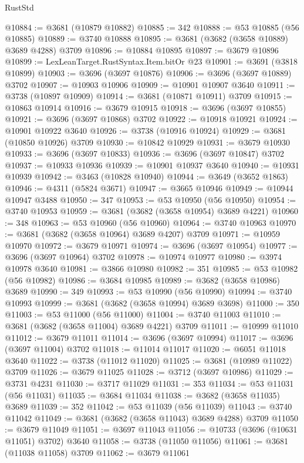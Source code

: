 \begin{lexlean}{RustStd}
\begin{coremodule}
@10884 := @3681 (@10879 @10882)
@10885 := 342
@10888 := @53 @10885 (@56 @10885)
@10889 := @3740 @10888
@10895 := @3681 (@3682 (@3658 @10889) @3689 @4288) @3709
@10896 := @10884 @10895
@10897 := @3679 @10896
@10899 := LexLeanTarget.RustSyntax.Item.bitOr @23
@10901 := @3691 (@3818 @10899)
@10903 := @3696 (@3697 @10876)
@10906 := @3696 (@3697 @10889) @3702
@10907 := @10903 @10906
@10909 := @10901 @10907 @3640
@10911 := @3738 (@10897 @10909)
@10914 := @3681 (@10871 @10911) @3709
@10915 := @10863 @10914
@10916 := @3679 @10915
@10918 := @3696 (@3697 @10855)
@10921 := @3696 (@3697 @10868) @3702
@10922 := @10918 @10921
@10924 := @10901 @10922 @3640
@10926 := @3738 (@10916 @10924)
@10929 := @3681 (@10850 @10926) @3709
@10930 := @10842 @10929
@10931 := @3679 @10930
@10933 := @3696 (@3697 @10833)
@10936 := @3696 (@3697 @10847) @3702
@10937 := @10933 @10936
@10939 := @10901 @10937 @3640
@10940 := @10931 @10939
@10942 := @3463 (@10828 @10940)
@10944 := @3649 (@3652 @1863)
@10946 := @4311 (@5824 @3671)
@10947 := @3665 @10946
@10949 := @10944 @10947 @3488
@10950 := 347
@10953 := @53 @10950 (@56 @10950)
@10954 := @3740 @10953
@10959 := @3681 (@3682 (@3658 @10954) @3689 @4221)
@10960 := 348
@10963 := @53 @10960 (@56 @10960)
@10964 := @3740 @10963
@10970 := @3681 (@3682 (@3658 @10964) @3689 @4207) @3709
@10971 := @10959 @10970
@10972 := @3679 @10971
@10974 := @3696 (@3697 @10954)
@10977 := @3696 (@3697 @10964) @3702
@10978 := @10974 @10977
@10980 := @3974 @10978 @3640
@10981 := @3866 @10980
@10982 := 351
@10985 := @53 @10982 (@56 @10982)
@10986 := @3684 @10985
@10989 := @3682 (@3658 @10986) @3689
@10990 := 349
@10993 := @53 @10990 (@56 @10990)
@10994 := @3740 @10993
@10999 := @3681 (@3682 (@3658 @10994) @3689 @3698)
@11000 := 350
@11003 := @53 @11000 (@56 @11000)
@11004 := @3740 @11003
@11010 := @3681 (@3682 (@3658 @11004) @3689 @4221) @3709
@11011 := @10999 @11010
@11012 := @3679 @11011
@11014 := @3696 (@3697 @10994)
@11017 := @3696 (@3697 @11004) @3702
@11018 := @11014 @11017
@11020 := @6051 @11018 @3640
@11022 := @3738 (@11012 @11020)
@11025 := @3681 (@10989 @11022) @3709
@11026 := @3679 @11025
@11028 := @3712 (@3697 @10986)
@11029 := @3731 @4231
@11030 := @3717 @11029
@11031 := 353
@11034 := @53 @11031 (@56 @11031)
@11035 := @3684 @11034
@11038 := @3682 (@3658 @11035) @3689
@11039 := 352
@11042 := @53 @11039 (@56 @11039)
@11043 := @3740 @11042
@11049 := @3681 (@3682 (@3658 @11043) @3689 @4288) @3709
@11050 := @3679 @11049
@11051 := @3697 @11043
@11056 := @10733 (@3696 (@10631 @11051) @3702) @3640
@11058 := @3738 (@11050 @11056)
@11061 := @3681 (@11038 @11058) @3709
@11062 := @3679 @11061

\end{coremodule}
\end{lexlean}
